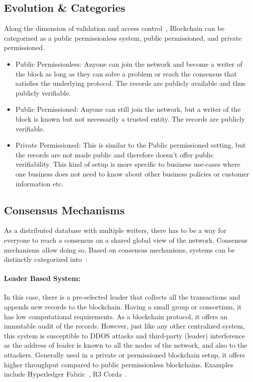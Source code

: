 \subsection{Evolution \& Categories}
Along the dimension of validation and access control~\cite{voronchenko2017you},
Blockchain can be categorized as a public permissionless system, public
permissioned, and private permissioned. 
\begin{itemize}
	\item Public Permissionless: Anyone can join the network and become a writer
		of the block as long as they can solve a problem or reach the consensus
		that satisfies the underlying protocol. The records are publicly
		available and thus publicly verifiable. 
	\item Public Permissioned: Anyone can still join the network, but a writer
		of the block is known but not necessarily a trusted entity. The records
		are publicly verifiable. 
	\item Private Permissioned: This is similar to the Public permissioned
		setting, but the records are not made public and therefore doesn't
		offer public verifiability. This kind of setup is more specific to
		business use-cases where one business does not need to know about other
		business policies or customer information etc. 
\end{itemize}
\subsection{Consensus Mechanisms}\label{subsec:consensus}
As a distributed database with multiple writers, there has to be a way for
everyone to reach a consensus on a shared global view of the network. Consensus
mechanisms allow doing so. Based on consensus mechanisms, systems can be
distinctly categorized into~\cite{HashgraphConsensusCategory}:
\paragraph{Leader Based System:} In this case, there is a pre-selected leader
that collects all the transactions and appends new records to the blockchain.
Having a small group or consortium, it has low computational requirements. As a
blockchain protocol, it offers an immutable audit of the records. However, just
like any other centralized system, this system is susceptible to DDOS attacks
and third-party (leader) interference as the address of leader is known to all
the nodes of the network, and also to the attackers. Generally used in a
private or permissioned blockchain setup, it offers higher throughput compared
to public permissionless blockchains. Examples include Hyperledger Fabric~\cite{androulaki2018hyperledger}, R3 Corda~\cite{brown2016corda}. 
